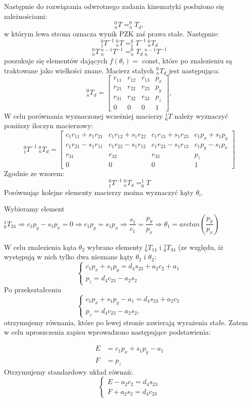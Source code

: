 \documentclass{article}
\begin{document}
Następnie do rozwiązania odwrotnego zadania kinematyki posłużono się zależno\'sciami:
\[_n^0T = _n^0T_d,\]
w którym lewa strona oznacza wynik PZK za\'s prawa stałe. Następnie:
\[_1^0T^{-1}~ _n^0T = _1^0T^{-1}~ _n^0T_d\]
\[_n^0T~ _n^{n-1}T^{-1} = _n^0T_d ~ _n^{n-1}T^{-1}\]
poszukuje się elementów dających $f(\theta_i)=$ const, które po znalezieniu są traktowane jako wielko\'sci znane.
Macierz stałych $_n^0T_d$ jest następująca:
\[
_n^0T_d =
\begin{bmatrix}
r_{11}	&r_{12}	&r_{13}	&p_x	\\
r_{21}	&r_{22}	&r_{23}	&p_y	\\
r_{31}	&r_{32}	&r_{33}	&p_z	\\
0		&0		&0		&1	
 \end{bmatrix}, 
\]
W celu porównania wyznaczonej wcze\'sniej macierzy $_{6}^{1}T$ należy wyznaczyć poniższy iloczyn macierzowy:
\[
_1^0T^{-1}~ _n^0T_d =
\begin{bmatrix}
c_1r_{11}+s_1r_{21}	&c_1r_{12}+s_1r_{22}	&c_1r_{13}+s_1r_{23}	&c_1p_x+s_1p_y	\\
c_1r_{21}-s_1r_{11}	&c_1r_{22}-s_1r_{12}	&c_1r_{23}-s_1r_{13}	&c_1p_y-s_1p_x	\\
r_{31}			&r_{32}			&r_{33}			&p_z	\\
0				&0				&0				&1	
 \end{bmatrix}
\]
Zgodnie ze wzorem:
\[_1^0T^{-1}~ _n^0T_d = _{6}^{1}T\]
Porównując kolejne elementy macierzy można wyznaczyć kąty $\theta_i$.

Wybieramy element $_6^1T_{24} \Rightarrow c_1p_y - s_1p_x = 0 \Rightarrow c_1p_y=s_1p_x \Rightarrow \dfrac{s_1}{c_1}=\dfrac{p_y}{p_x} \Rightarrow \theta_1 = arctan \left ( \dfrac{p_y}{p_x} \right )$

W celu znalezienia kąta $\theta_2$ wybrano elementy $_6^1T_{14}$ i $_6^1T_{34}$ (ze względu, iż występują w nich tylko dwa nieznane kąty $\theta_2$ i $\theta_2$:
\[
\begin{cases}
c_1p_x+s_1p_y = d_4s_{23}+a_2c_2+a_1\\
p_z = d_4c_{23}-a_2s_2
\end{cases}
\]
Po przekształceniu
\[
\begin{cases}
c_1p_x+s_1p_y-a_1 = d_4s_{23}+a_2c_2\\
p_z = d_4c_{23}  - a_2s_2 ,
\end{cases}
\]
otrzymujemy równania, które po lewej stronie zawierają wyrażenia stałe. Zatem w celu uproszczenia zapisu wprowadzono następujące podstawienia:

\begin{align*}
E &= c_1p_x+s_1p_y-a_1\\
F &= p_z
\end{align*}
Otrzymujemy standardowy układ równań:
\[
\begin{cases}
E - a_2c_2 = d_4s_{23}\\
F +a_2s_2 = d_4c_{23}
\end{cases}
\]
\end{document}
